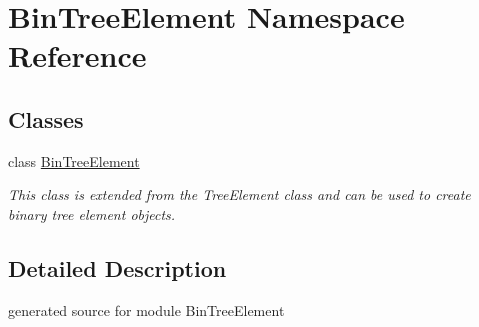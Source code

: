 \hypertarget{namespace_bin_tree_element}{}\section{Bin\+Tree\+Element Namespace Reference}
\label{namespace_bin_tree_element}
\subsection*{Classes}
\begin{DoxyCompactItemize}
\item 
class \hyperlink{class_bin_tree_element_1_1_bin_tree_element}{Bin\+Tree\+Element}
\begin{DoxyCompactList}\small\item\em This class is extended from the Tree\+Element class and can be used to create binary tree element objects. \end{DoxyCompactList}\end{DoxyCompactItemize}


\subsection{Detailed Description}
\begin{DoxyVerb}generated source for module BinTreeElement \end{DoxyVerb}
 